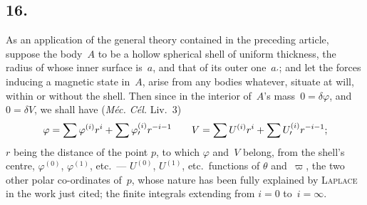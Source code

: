 \documentclass[12pt,notitlepage]{amsart}
\let\Person\textsc
\let\Title\textit
\newcommand\Section[1]{\subsection{{#1}}}
\renewcommand{\phi}{\varphi}
\begin{document}
\Section{16.}
As an application of the general theory contained in the preceding
article, suppose the body~$A$
to be a hollow spherical shell of uniform thickness,
the radius of whose inner surface is~$a$,
and that of its outer one~$a_\prime$; and let
the forces inducing a magnetic state in~$A$, arise from any bodies whatever,
situate at will, within or without the shell. Then since in the interior 
of~$A$'s
mass~${0=\delta\phi}$, and~${0=\delta V}$,
we shall have (\Title{M\'ec. C\'el.} Liv.~3)
\[
\phi=\sum\phi^{(i)}r^i+\sum\phi^{(i)}_\prime r^{-i-1}
\quad\text\quad
V=\sum U^{(i)}r^i+\sum U^{(i)}_\prime r^{-i-1};
\]
$r$ being the distance of the point $p$, to which $\phi$ and~$V$ belong,
from the
shell's centre, $\phi^{(0)}$, $\phi^{(1)}$, etc.\ --- $U^{(0)}$, $U^{(1)}$,
etc.\ functions of $\theta$ and~$\varpi$, the two
other polar co-ordinates of~$p$, whose nature has been fully explained by
\Person{Laplace} in the work just cited;
the finite integrals extending from $i=0$
to~$i=\infty$.
\end{document}
